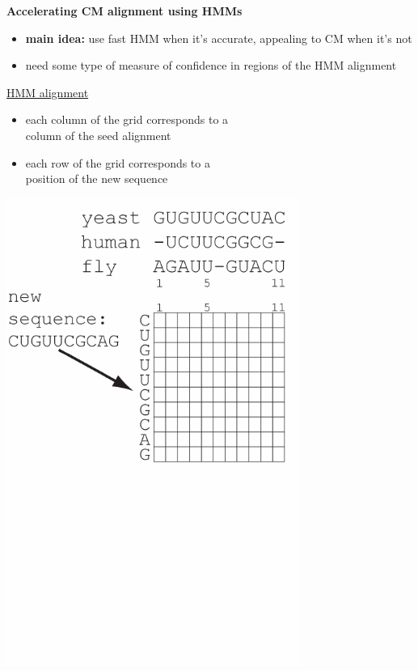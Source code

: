 \documentclass[landscape]{slides}
\begin{document}
\begin{slide}
\begin{center}

\textbf{Accelerating CM alignment using HMMs}
\end{center}
\medskip
\begin{minipage}{6in}
\footnotesize
\begin{itemize}
\item
\textbf{main idea:} use fast HMM when it's accurate, appealing to CM when it's not
\item
need some type of measure of confidence in regions of the HMM alignment

\end{itemize}
\small
\hspace{0.3in}
\underline{HMM alignment}%
\begin{itemize}

\item
each column of the grid corresponds to a \\ column
of the seed alignment
\item
each row of the grid corresponds to a \\ position of the new sequence
\end{itemize}
\vspace{3in}
\end{minipage}
\begin{minipage}{4in}
\begin{center}
\includegraphics[height=6in]{figs/hmm_alignment2_layer1}
\end{center}
\vspace{1.5in}
\end{minipage}
\end{slide}
\end{document}
